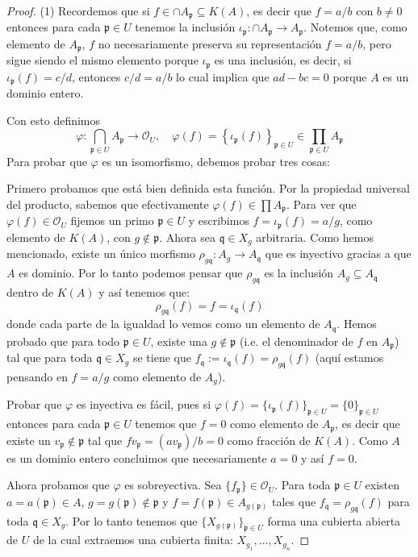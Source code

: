 \documentclass[10pt]{report}
\theoremstyle{plain}\newtheorem{thm}{Teorema}
\theoremstyle{plain}\newtheorem{lem}[thm]{Lema}
\theoremstyle{plain}\newtheorem*{conjecture*}{Conjetura}
\theoremstyle{plain}\newtheorem{cor}[thm]{Corolario}
\theoremstyle{definition}\newtheorem{defin}{Definici\'on}
\theoremstyle{definition}\newtheorem*{defin*}{Definici\'on}
\theoremstyle{remark}\newtheorem{claim}{Proposici\'on}
\theoremstyle{remark}\newtheorem*{claim*}{Proposici\'on}
\theoremstyle{remark}\newtheorem*{eje*}{$\mathbf{Ejercicio}$}
\theoremstyle{remark}\newtheorem{exa}{Ejemplo}
\newcommand{\p}{\mathfrak{p}} %
\newcommand{\q}{\mathfrak{q}} %
\newcommand{\OO}{\mathcal{O}} %
\newcommand{\ra}{\rightarrow}
\begin{document}
\begin{proof}
(1) Recordemos que si $f\in \cap A_{\p}\subseteq K(A)$, es decir que $f=a/b$ con $b\neq0$ entonces para cada $\p\in U$
tenemos la inclusi\'on $\iota_{\p}:\cap A_{\p} \ra A_{\p}$. Notemos que, como elemento de $A_{\p}$, $f$ no necesariamente
preserva su representaci\'on $f=a/b$, pero sigue siendo el mismo elemento porque $\iota_{\p}$ es una inclusi\'on, es decir,
si $\iota_{\p}(f)=c/d$, entonces $c/d=a/b$ lo cual implica que $ad-bc=0$ porque $A$ es un dominio entero.

Con esto definimos
\[
	\varphi:\bigcap_{\p\in U} A_{\p} \ra \OO_U,\quad \varphi(f)=\left\{\iota_{\p}(f)\right\}_{\p\in U}\in \prod_{\p\in U} A_{\p}
\]
Para probar que $\varphi$ es un isomorfismo, debemos probar tres cosas:

	Primero probamos que est\'a bien definida esta funci\'on. Por la propiedad universal del producto, sabemos que
	efectivamente $\varphi(f)\in\prod A_{\p}$. Para ver que $\varphi(f)\in\OO_U$ fijemos un primo $\p\in U$ y escribimos
	$f=\iota_{\p}(f)=a/g$, como elemento de $K(A)$, con $g\not\in\p$. Ahora sea $\q\in X_g$ arbitraria. Como hemos mencionado,
	existe un \'unico morfismo $\rho_{g\q}:A_g \ra A_{\q}$ que es inyectivo gracias a que $A$ es dominio. Por lo tanto
	podemos pensar que $\rho_{g\q}$ es la inclusi\'on $A_g\subseteq A_{\q}$ dentro de $K(A)$ y as\'i tenemos que:
	\[
		\rho_{g\q}(f)=f=\iota_{\q}(f)
	\]
	donde cada parte de la igualdad lo vemos como un elemento de $A_{\q}$. Hemos probado que para todo $\p\in U$, existe una
	$g\not\in\p$ (i.e. el denominador de $f$ en $A_{\p}$) tal que para toda $\q\in X_{g}$ se tiene que
	$f_{\q}:=\iota_{\q}(f)=\rho_{g\q}(f)$ (aqu\'i estamos pensando en $f=a/g$ como elemento de $A_g$).
	
	Probar que $\varphi$ es inyectiva es f\'acil, pues si $\varphi(f)=\{\iota_{\p}(f)\}_{\p\in U}=\{0\}_{\p\in U}$ entonces
	para cada $\p\in U$ tenemos que $f=0$ como elemento de $A_{\p}$, es decir que existe un $v_{\p}\not\in \p$ tal que
	$f v_{\p}=(a v_{\p})/b=0$ como fracci\'on de $K(A)$. Como $A$ es un dominio entero concluimos que necesariamente $a=0$
	y as\'i $f=0$.
	
	Ahora probamos que $\varphi$ es sobreyectiva. Sea $\{f_{\p}\}\in\OO_U$. Para toda $\p\in U$ existen $a=a(\p)\in A$,
	$g=g(\p)\not\in \p$ y $f=f(\p)\in A_{g(\p)}$ tales que $f_{\q}=\rho_{g\q}(f)$ para toda $\q\in X_g$.
	Por lo tanto tenemos que $\{X_{g(\p)}\}_{\p\in U}$ forma una cubierta abierta de $U$ de la cual extraemos una
	cubierta finita: $X_{g_1},\ldots, X_{g_n}$.
	

\end{proof}
\end{document}
